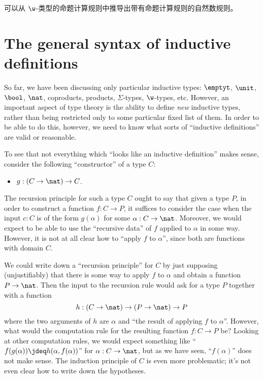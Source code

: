 \begin{thm}
    可以从 $\w$-类型的命题计算规则中推导出带有命题计算规则的自然数规则。
\end{thm}


\section{The general syntax of inductive definitions}
\label{sec:strictly-positive}

%
%

So far, we have been discussing only particular inductive types: $\emptyt$, $\unit$, $\bool$, $\nat$, coproducts, products, $\Sigma$-types, $\w$-types, etc.
However, an important aspect of type theory is the ability to define \emph{new} inductive types, rather than being restricted only to some particular fixed list of them.
In order to be able to do this, however, we need to know what sorts of ``inductive definitions'' are valid or reasonable.

To see that not everything which ``looks like an inductive definition'' makes sense, consider the following ``constructor'' of a type $C$:
\begin{itemize}
\item $g:(C\to \nat) \to C$.
\end{itemize}
The recursion principle for such a type $C$ ought to say that given a type $P$, in order to construct a function $f:C\to P$, it suffices to consider the case when the input $c:C$ is of the form $g(\alpha)$ for some $\alpha:C\to\nat$.
Moreover, we would expect to be able to use the ``recursive data'' of $f$ applied to $\alpha$ in some way.
However, it is not at all clear how to ``apply $f$ to $\alpha$'', since both are functions with domain $C$.

We could write down a ``recursion principle'' for $C$ by just supposing (unjustifiably) that there is some way to apply $f$ to $\alpha$ and obtain a function $P\to\nat$.
Then the input to the recursion rule would ask for a type $P$ together with a function
\begin{equation}
  h:(C\to\nat) \to (P\to\nat) \to P\label{eq:fake-recursor}
\end{equation}
where the two arguments of $h$ are $\alpha$ and ``the result of applying $f$ to $\alpha$''.
However, what would the computation rule for the resulting function $f:C\to P$ be?
Looking at other computation rules, we would expect something like ``$f(g(\alpha)) \jdeq h(\alpha,f(\alpha))$'' for $\alpha:C\to\nat$, but as we have seen, ``$f(\alpha)$'' does not make sense.
The induction principle of $C$ is even more problematic; it's not even clear how to write down the hypotheses.

